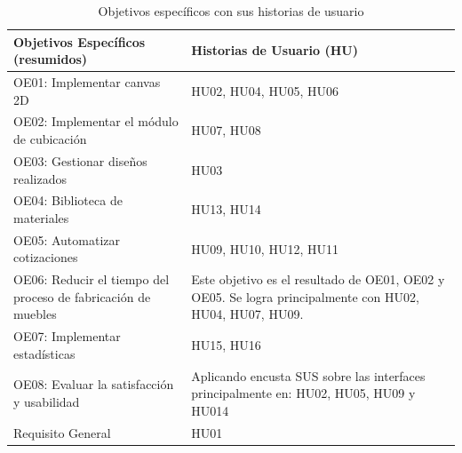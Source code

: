 ﻿\documentclass{iccmemoria}
\begin{document}
\begin{table}[H]
    \centering
    \caption{Objetivos específicos con sus historias de usuario}
    \label{tab:OE_historias_de_usuario} 
    
    \begin{tabular}{|p{7cm}|p{7cm}|} 
        \hline %
        
        \textbf{Objetivos Específicos (resumidos) } & \textbf{Historias de Usuario (HU)}\\
        \hline %
        
OE01: Implementar canvas 2D & HU02, HU04, HU05, HU06\\
\hline
OE02: Implementar el módulo de cubicación & HU07, HU08\\
\hline
OE03: Gestionar diseños realizados & HU03\\
\hline
OE04: Biblioteca de materiales & HU13, HU14\\
\hline
OE05: Automatizar cotizaciones & HU09, HU10, HU12, HU11\\
\hline
OE06: Reducir el tiempo del proceso de fabricación de muebles & Este objetivo es el resultado de OE01, OE02 y OE05. Se logra principalmente con HU02, HU04, HU07, HU09.\\
\hline
OE07: Implementar estadísticas & HU15, HU16\\
\hline
OE08: Evaluar la satisfacción y usabilidad & Aplicando encusta SUS sobre las interfaces principalmente en: HU02, HU05, HU09 y HU014\\
\hline
Requisito General & HU01\\
        \hline %
    \end{tabular}
\end{table}
\end{document}
